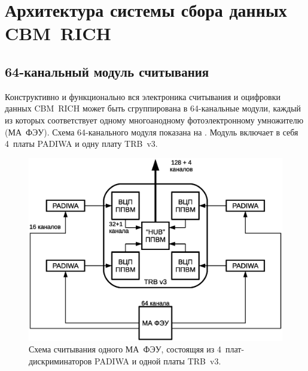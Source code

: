 \section{Архитектура системы сбора данных CBM~RICH}\label{section:secReadout}

\subsection{64-канальный модуль считывания}\label{section:secModule}

Конструктивно и функционально вся электроника считывания и оцифровки данных CBM~RICH может быть сгруппирована в 64-канальные модули, каждый из которых соответствует одному многоанодному фотоэлектронному умножителю (МА~ФЭУ). Схема 64-канального модуля показана на . Модуль включает в себя 4~платы PADIWA и одну плату TRB~v3.

\begin{figure}
\includegraphics[width=1.0\textwidth]{pictures/4_A_PMT_readout_rus.eps}
\caption{Схема считывания одного МА~ФЭУ, состоящяя из 4~плат-дискриминаторов PADIWA и одной платы TRB~v3.}
\label{fig:ReadoutModule}
\end{figure}

